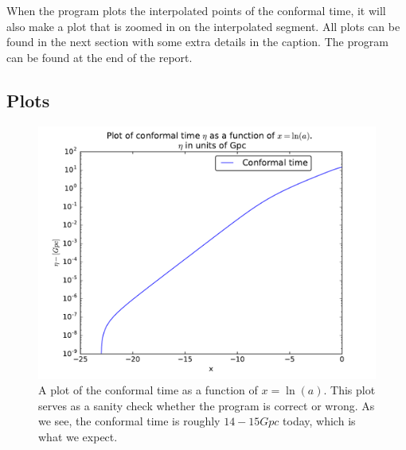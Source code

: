 \documentclass[12pt]{article}
\begin{document}
When the program plots the interpolated points of the conformal time, it will also make a plot that is zoomed in on the interpolated segment. All plots can be found in the next section with some extra details in the caption. The program can be found at the end of the report.

\newpage
\subsection*{Plots}
\begin{figure}[h]
\centering
\includegraphics[width=\linewidth]{Plots/ConformalTime_SanityCheck.pdf}
\caption{A plot of the conformal time as a function of $x=\ln (a)$. This plot serves as a sanity check whether the program is correct or wrong. As we see, the conformal time is roughly $14-15 Gpc$ today, which is what we expect.}
\label{fig:Conformal_time}
\end{figure}
\end{document}

